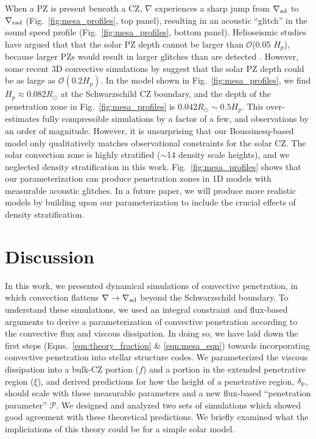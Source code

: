 \documentclass[twocolumn]{aastex631}
\newcommand{\gradrad}{\ensuremath{\nabla_{\rm{rad}}}}
\newcommand{\gradad}{\ensuremath{\nabla_{\rm{ad}}}}
\newcommand{\justgrad}{\ensuremath{\nabla}}
\newcommand{\delp}{\ensuremath{\delta_{\rm{p}}}}
\newcommand{\mP}{\ensuremath{\mathcal{P}}}
\begin{document}
When a PZ is present beneath a CZ, $\justgrad$ experiences a sharp jump from $\gradad$ to $\gradrad$ (Fig.~\ref{fig:mesa_profiles}, top panel), resulting in an acoustic ``glitch'' in the sound speed profile (Fig.~\ref{fig:mesa_profiles}, bottom panel).
Helioseismic studies have argued that that the solar PZ depth cannot be larger than $\mathcal{O}$(0.05 $H_p$), because larger PZs would result in larger glitches than are detected  \citep[see Sct.~7.2.1 of][for a nice review]{basu2016}.
However, some recent 3D convective simulations by \citet{kapyla2019} suggest that the solar PZ depth could be as large as $\mathcal{O}(0.2 H_p)$.
In the model shown in Fig.~\ref{fig:mesa_profiles}, we find $H_p \approx 0.082R_\odot$ at the Schwarzschild CZ boundary, and the depth of the penetration zone in Fig.~\ref{fig:mesa_profiles} is $0.042R_\odot \sim 0.5 H_p$.
This over-estimates fully compressible simulations by a factor of a few, and observations by an order of magnitude.
However, it is unsurprising that our Boussinesq-based model only qualitatively matches observational constraints for the solar CZ.
The solar convection zone is highly stratified ($\sim$14 density scale heights), and we neglected density stratification in this work.
Fig.~\ref{fig:mesa_profiles} shows that our parameterization can produce penetration zones in 1D models with measurable acoustic glitches.
In a future paper, we will produce more realistic models by building upon our parameterization to include the crucial effects of density stratification.


\section{Discussion}
\label{sec:discussion}
In this work, we presented dynamical simulations of convective penetration, in which convection flattens $\justgrad \rightarrow \gradad$ beyond the Schwarzschild boundary.
To understand these simulations, we used an integral constraint \citep[reminiscent of][]{roxburgh1989} and flux-based arguments \citep[similar to][]{zahn1991} to derive a parameterization of convective penetration according to the convective flux and viscous dissipation.
In doing so, we have laid down the first steps (Eqns.~\ref{eqn:theory_fraction} \& \ref{eqn:mesa_eqn}) towards incorporating convective penetration into stellar structure codes.
We parameterized the viscous dissipation into a bulk-CZ portion ($f$) and a portion in the extended penetrative region ($\xi$), and derived predictions for how the height of a penetrative region, $\delp$, should scale with these measurable parameters and a new flux-based ``penetration parameter'' $\mP$.
We designed and analyzed two sets of simulations which showed good agreement with these theoretical predictions.
We briefly examined what the impliciations of this theory could be for a simple solar model.
\end{document}
